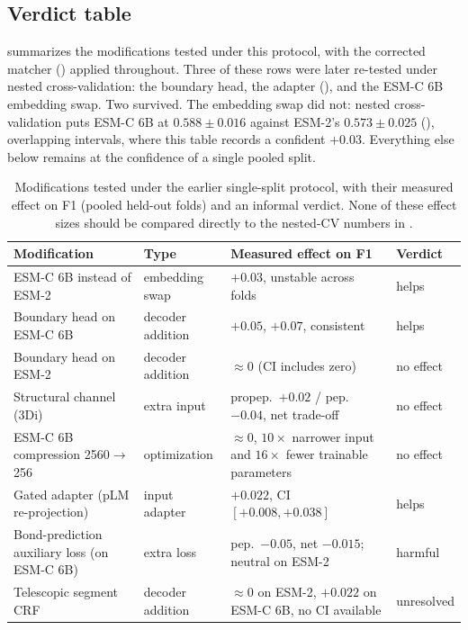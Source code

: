 \documentclass{article}
\begin{document}
\subsection{Verdict table}

 summarizes the modifications tested under this protocol, with the corrected matcher () applied throughout. Three of these rows were later re-tested under nested cross-validation: the boundary head, the adapter (), and the ESM-C 6B embedding swap. Two survived. The embedding swap did not: nested cross-validation puts ESM-C 6B at $0.588\pm0.016$ against ESM-2's $0.573\pm0.025$ (), overlapping intervals, where this table records a confident $+0.03$. Everything else below remains at the confidence of a single pooled split.

\begin{table}[h]
\centering
\caption{Modifications tested under the earlier single-split protocol, with their measured effect on F1 (pooled held-out folds) and an informal verdict. None of these effect sizes should be compared directly to the nested-CV numbers in .}
\label{tab:verdict}
\small
\begin{tabular}{p{3.4cm} p{2.1cm} p{4.6cm} p{1.7cm}}
\toprule
\textbf{Modification} & \textbf{Type} & \textbf{Measured effect on F1} & \textbf{Verdict} \\
\midrule
ESM-C 6B instead of ESM-2 & embedding swap & $+0.03$, unstable across folds & helps \\
Boundary head on ESM-C 6B & decoder addition & $+0.05$, $+0.07$, consistent & helps \\
Boundary head on ESM-2 & decoder addition & $\approx 0$ (CI includes zero) & no effect \\
Structural channel (3Di) & extra input & propep.\ $+0.02$ / pep.\ $-0.04$, net trade-off & no effect \\
ESM-C 6B compression 2560$\to$256 & optimization & $\approx 0$, $10\times$ narrower input and $16\times$ fewer trainable parameters & no effect \\
Gated adapter (pLM re-projection) & input adapter & $+0.022$, CI $[+0.008, +0.038]$ & helps \\
Bond-prediction auxiliary loss (on ESM-C 6B) & extra loss & pep.\ $-0.05$, net $-0.015$; neutral on ESM-2 & harmful \\
Telescopic segment CRF & decoder addition & $\approx 0$ on ESM-2, $+0.022$ on ESM-C 6B, no CI available & unresolved \\
\bottomrule
\end{tabular}
\end{table}
\end{document}
